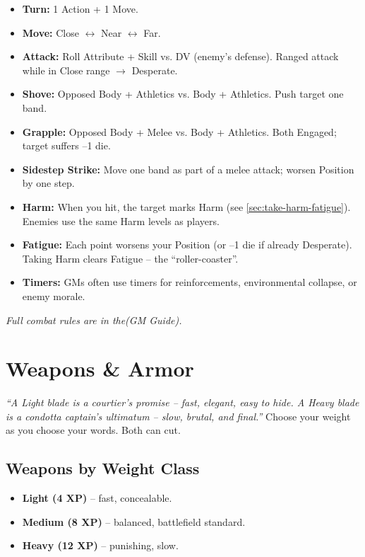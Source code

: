 \begin{tcolorbox}[colback=gray!5!white,colframe=gray!75!black,title=\textbf{Combat in Brief},breakable]
  \begin{itemize}
    \item \textbf{Turn:} 1 Action + 1 Move.
    \item \textbf{Move:} Close $\leftrightarrow$ Near $\leftrightarrow$ Far.
    \item \textbf{Attack:} Roll Attribute + Skill vs. DV (enemy's defense).  
          Ranged attack while in Close range $\rightarrow$ Desperate.
    \item \textbf{Shove:} Opposed Body + Athletics vs. Body + Athletics. Push target one band.
    \item \textbf{Grapple:} Opposed Body + Melee vs. Body + Athletics. Both Engaged; target suffers --1 die.
    \item \textbf{Sidestep Strike:} Move one band as part of a melee attack; worsen Position by one step.
    \item \textbf{Harm:} When you hit, the target marks Harm (see \ref{sec:take-harm-fatigue}).  
          Enemies use the same Harm levels as players.
    \item \textbf{Fatigue:} Each point worsens your Position (or --1 die if already Desperate).  
          Taking Harm clears Fatigue -- the ``roller-coaster''.
    \item \textbf{Timers:} GMs often use timers for reinforcements, environmental collapse, or enemy morale.
  \end{itemize}
  \textit{Full combat rules are in the(GM Guide).}
\end{tcolorbox}

\section{Weapons \& Armor}
\label{sec:weapons-armor}

\begin{tcolorbox}[colback=green!5!white,colframe=green!70!black,title=\textit{Silkstrand Steel},breakable]
\emph{``A Light blade is a courtier's promise -- fast, elegant, easy to hide. A Heavy blade is a condotta captain's ultimatum -- slow, brutal, and final.''}  
Choose your weight as you choose your words. Both can cut.
\end{tcolorbox}

\subsection{Weapons by Weight Class}
\label{sec:weapon-weight}
\begin{itemize}
  \item \textbf{Light (4 XP)} -- fast, concealable.
  \item \textbf{Medium (8 XP)} -- balanced, battlefield standard.
  \item \textbf{Heavy (12 XP)} -- punishing, slow.
\end{itemize}

